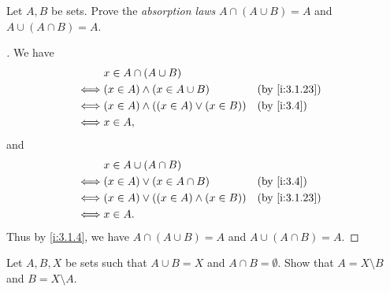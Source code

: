 \begin{ex}\label{i:ex:3.1.8}
  Let \(A, B\) be sets.
  Prove the \emph{absorption laws} \(A \cap (A \cup B) = A\) and \(A \cup (A \cap B) = A\).
\end{ex}

\begin{proof}[]
  We have
  \begin{align*}
         & x \in A \cap (A \cup B)                                       \\
    \iff & (x \in A) \land (x \in A \cup B)           &  & \by{i:3.1.23} \\
    \iff & (x \in A) \land ((x \in A) \lor (x \in B)) &  & \by{i:3.4}    \\
    \iff & x \in A,
  \end{align*}
  and
  \begin{align*}
         & x \in A \cup (A \cap B)                                       \\
    \iff & (x \in A) \lor (x \in A \cap B)            &  & \by{i:3.4}    \\
    \iff & (x \in A) \lor ((x \in A) \land (x \in B)) &  & \by{i:3.1.23} \\
    \iff & x \in A.
  \end{align*}
  Thus by \cref{i:3.1.4}, we have \(A \cap (A \cup B) = A\) and \(A \cup (A \cap B) = A\).
\end{proof}

\begin{ex}\label{i:ex:3.1.9}
  Let \(A, B, X\) be sets such that \(A \cup B = X\) and \(A \cap B = \emptyset\).
  Show that \(A = X \setminus B\) and \(B = X \setminus A\).
\end{ex}

